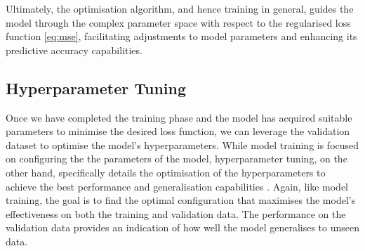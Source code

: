 Ultimately, the optimisation algorithm, and hence training in general, guides the model through the complex parameter space with respect to the regularised loss function \ref{eq:mse}, facilitating adjustments to model parameters and enhancing its predictive accuracy capabilities.


\subsection{Hyperparameter Tuning}
\label{subsec:4 Hyperparameter Tuning}

Once we have completed the training phase and the model has acquired suitable parameters to minimise the desired loss function, we can leverage the validation dataset to optimise the model's hyperparameters. While model training is focused on configuring the the parameters of the model, hyperparameter tuning, on the other hand, specifically details the optimisation of the hyperparameters to achieve the best performance and generalisation capabilities \cite{diaz2017effective}. Again, like model training, the goal is to find the optimal configuration that maximises the model's effectiveness on both the training and validation data. The performance on the validation data provides an indication of how well the model generalises to unseen data. 

